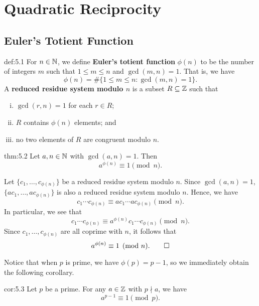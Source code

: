 \section{Quadratic Reciprocity}\label{sec:5}

\subsection{Euler's Totient Function}\label{subsec:5.1}

\vspace{2ex}
\begin{defn}{def:5.1}
    For $n \in \mathbb{N}$, we define {\bf Euler's totient function} $\phi(n)$ to be 
    the number of integers $m$ such that $1 \leq m \leq n$ and $\gcd(m, n) = 1$. 
    That is, we have 
    \[ \phi(n) = \#\{1 \leq m \leq n : \gcd(m, n) = 1\}. \] 
    A {\bf reduced residue system modulo $n$} is a subset $R \subseteq \mathbb{Z}$ such that 
    \begin{enumerate}[(i)]
        \item $\gcd(r, n) = 1$ for each $r \in R$; 
        \item $R$ contains $\phi(n)$ elements; and 
        \item no two elements of $R$ are congruent modulo $n$. 
    \end{enumerate}
\end{defn}

\begin{theo}{thm:5.2}
    Let $a, n \in \mathbb{N}$ with $\gcd(a, n) = 1$. Then 
    \[ a^{\phi(n)} \equiv 1 \pmod n. \] 
\end{theo}
\begin{pf}
    Let $\{c_1, \dots, c_{\phi(n)}\}$ be a reduced residue system modulo $n$. 
    Since $\gcd(a, n) = 1$, $\{ac_1, \dots, ac_{\phi(n)}\}$ is also a 
    reduced residue system modulo $n$. Hence, we have 
    \[ c_1 \cdots c_{\phi(n)} \equiv ac_1 \cdots ac_{\phi(n)} \pmod n. \] 
    In particular, we see that 
    \[ c_1 \cdots c_{\phi(n)} \equiv a^{\phi(n)} c_1 \cdots c_{\phi(n)} \pmod n. \] 
    Since $c_1, \dots, c_{\phi(n)}$ are all coprime with $n$, it follows that 
    \[ a^{\phi(n)} \equiv 1 \pmod n. \qedhere \] 
\end{pf}

Notice that when $p$ is prime, we have $\phi(p) = p-1$, so we immediately 
obtain the following corollary. 

\begin{cor}{cor:5.3}
    Let $p$ be a prime. For any $a \in \mathbb{Z}$ with $p \nmid a$, we have 
    \[ a^{p-1} \equiv 1 \pmod p. \] 
\end{cor}

